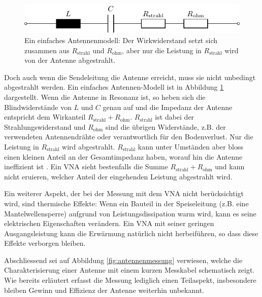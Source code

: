 \documentclass[twoside,a4paper,11pt,halfparskip,DIV=11,notitlepage]{scrartcl}
\begin{document}
\begin{figure}[H]
    \begin{center}
        \includegraphics{figures/antenna_model/antenna_model.pdf}
    \end{center}
    \caption{Ein einfaches Antennenmodell: Der Wirkwiderstand setzt sich zusammen aus $R_\text{strahl}$
    und $R_\text{ohm}$, aber nur die Leistung in $R_\text{strahl}$ wird von der Antenne abgestrahlt.}
    \label{fig:antennenmodell}
\end{figure}

Doch auch wenn die Sendeleitung die Antenne erreicht, muss sie nicht unbedingt
abgestrahlt werden. Ein einfaches Antennen-Modell ist in Abbildung \ref{fig:antennenmodell}
dargestellt. Wenn die Antenne in Resonanz ist, so heben sich die Blindwiderstände von
$L$ und $C$ genau auf und die Impedanz der Antenne entspricht dem Wirkanteil
$R_\text{strahl}+R_\text{ohm}$. $R_\text{strahl}$ ist dabei der Strahlungswiderstand und
$R_\text{ohm}$ sind die übrigen Widerstände, z.B. der verwendeten Antennendrähte oder
verantwortlich für den Bodenverlust. Nur die Leistung in $R_\text{strahl}$ wird
abgestrahlt. $R_\text{strahl}$ kann unter Umständen aber bloss einen kleinen
Anteil an der Gesamtimpedanz haben, worauf hin die Antenne ineffizient ist
\cite{smith1947performance}.  Ein VNA sieht bestenfalls die Summe
$R_\text{strahl}+R_\text{ohm}$ und kann nicht eruieren, welcher Anteil der
eingehenden Leistung abgestrahlt wird.

Ein weiterer Aspekt, der bei der Messung mit dem VNA nicht
berücksichtigt wird, sind thermische Effekte: Wenn ein Bauteil in der Speiseleitung
(z.B. eine Mantelwellensperre) aufgrund von Leistungsdissipation warm wird, kann es seine
elektrischen Eigenschaften verändern. Ein VNA mit seiner geringen Ausgangsleistung kann
die Erwärmung natürlich nicht herbeiführen, so dass diese Effekte verborgen bleiben.

Abschliessend sei auf Abbildung \ref{fig:antennenmessung} verwiesen, welche die Charakterisierung
einer Antenne mit einem kurzen Messkabel schematisch zeigt. Wie bereits erläutert erfasst
die Messung lediglich einen Teilaspekt, insbesondere bleiben Gewinn und Effizienz der
Antenne weiterhin unbekannt.

\newpage %
\end{document}
